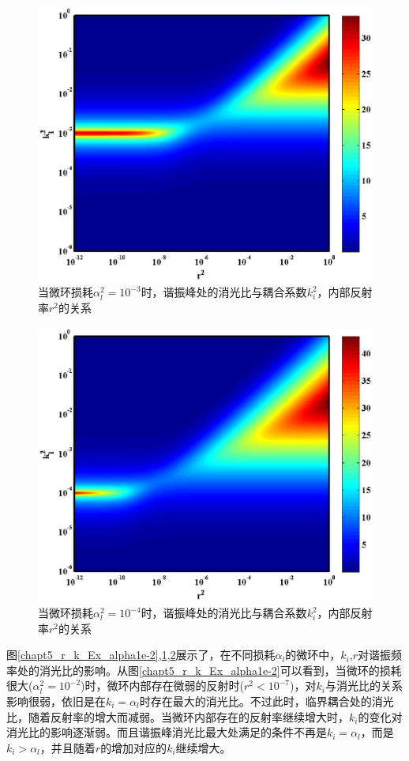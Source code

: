 \begin{figure}[htb]
	\centering
	\includegraphics[width=12cm]{./Pictures/chapt5_r_k_Ex_alpha1e-3.eps}
	\caption{当微环损耗$\alpha_l^2= 10^{-3}$时，谐振峰处的消光比与耦合系数$k_i^2$，内部反射率$r^2$的关系}
	\label{chapt5_r_k_Ex_alpha1e-3}
\end{figure}
\begin{figure}[htb]
	\centering
	\includegraphics[width=12cm]{./Pictures/chapt5_r_k_Ex_alpha1e-4.eps}
	\caption{当微环损耗$\alpha_l^2= 10^{-4}$时，谐振峰处的消光比与耦合系数$k_i^2$，内部反射率$r^2$的关系}
	\label{chapt5_r_k_Ex_alpha1e-4}
\end{figure}
图\ref{chapt5_r_k_Ex_alpha1e-2},\ref{chapt5_r_k_Ex_alpha1e-3},\ref{chapt5_r_k_Ex_alpha1e-4}展示了，在不同损耗$\alpha_l$的微环中，$k_i$,$r$对谐振频率处的消光比的影响。从图\ref{chapt5_r_k_Ex_alpha1e-2}可以看到，当微环的损耗很大($\alpha_l^2 = 10^{-2}$)时，微环内部存在微弱的反射时($r^2<10^{-7}$)，对$k_i$与消光比的关系影响很弱，依旧是在$k_i=\alpha_l$时存在最大的消光比。不过此时，临界耦合处的消光比，随着反射率的增大而减弱。当微环内部存在的反射率继续增大时，$k_i$的变化对消光比的影响逐渐弱。而且谐振峰消光比最大处满足的条件不再是$k_i = \alpha_l$，而是$k_i > \alpha_l$，并且随着$r$的增加对应的$k_i$继续增大。

